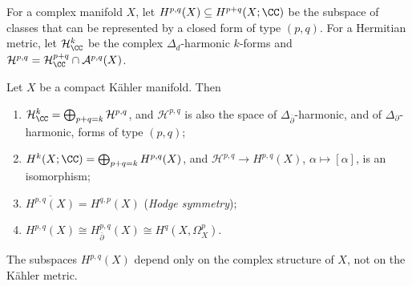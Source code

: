 \begin{definition}\label{kahler:definition-hpq}
For a complex manifold $X$, let $H^{p,q}(X) \subseteq H^{p+q}(X; \CC)$ be the subspace of classes that can be represented by a closed form
of type $(p,q)$. For a Hermitian metric, let $\mathcal{H}^k_{\CC}$ be the complex $\Delta_d$-harmonic $k$-forms and
$\mathcal{H}^{p,q} = \mathcal{H}^{p+q}_{\CC} \cap \mathcal{A}^{p,q}(X)$.
\end{definition}

\begin{theorem}\label{kahler:theorem-hodge-decomposition}
Let $X$ be a compact K\"ahler manifold. Then
\begin{enumerate}
\item $\mathcal{H}^k_{\CC} = \bigoplus_{p+q=k}\mathcal{H}^{p,q}$, and $\mathcal{H}^{p,q}$ is also the space of $\Delta_{\bar\partial}$-harmonic,
and of $\Delta_\partial$-harmonic, forms of type $(p,q)$;
\item $H^k(X; \CC) = \bigoplus_{p+q=k}H^{p,q}(X)$, and $\mathcal{H}^{p,q} \to H^{p,q}(X)$, $\alpha \mapsto [\alpha]$, is an isomorphism;
\item $\overline{H^{p,q}(X)} = H^{q,p}(X)$ (\emph{Hodge symmetry});
\item $H^{p,q}(X) \cong H^{p,q}_{\bar\partial}(X) \cong H^q(X, \Omega^p_X)$.
\end{enumerate}
The subspaces $H^{p,q}(X)$ depend only on the complex structure of $X$, not on the K\"ahler metric.
\end{theorem}

